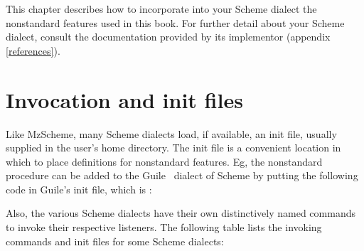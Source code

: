 This chapter describes how to incorporate into your
Scheme dialect the nonstandard features used in this
book.  For further detail about your Scheme
dialect, consult the documentation provided by its
implementor (appendix \ref{references}).

\iffalse
\section{Invocation and init files}

\index{Guile}
\index{SCM}
\index{STk}


To invoke the Guile \cite{guile} listener, type \p{guile}.  To invoke
SCM \cite{scm}, type \p{scm}. 

To invoke STk \cite{stk}, type \p{snow}.  This is the 
``no window'' executable, which is enough for the purposes
of this book. 
\fi


\section{Invocation and init files}


Like MzScheme, many Scheme dialects load, if
available, an init file, usually supplied in the user's
home directory.  The init file is a convenient location
in which to place definitions for nonstandard features.
Eg, the nonstandard procedure
 can be added to
the Guile~\cite{guile} dialect of Scheme by putting the
following code in Guile's init file, which is
:


Also, the various Scheme dialects have their own
distinctively named commands to invoke their respective
listeners.  The following
table lists the invoking commands and init files
for some Scheme dialects:


